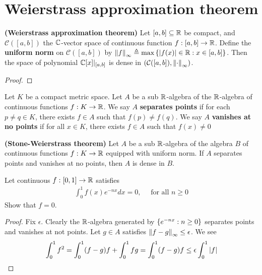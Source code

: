\documentclass{report}
\begin{document}
\section{Weierstrass approximation theorem} 

\begin{theorem}
\label{THWat}
\textbf{(Weierstrass approximation theorem)} Let $[a,b]\subseteq \mathbb{R}$ be compact, and $\mathcal{C}([a,b])$ the $\mathbb{C}$-vector space of continuous function $f:[a,b]\rightarrow \mathbb{R}$. Define the \textbf{uniform norm} on $\mathcal{C}([a,b])$ by $\left\| f \right\|_{\infty} \triangleq \max \left\{ \left|f(x)\right| \in\mathbb{R}: x \in [a,b] \right\}$. Then the space of polynomial $\mathbb{C}[x]|_{[a,b]}$ is dense in $\left(\mathcal{C}([a,b]), \left\| \cdot \right\|_{\infty} \right)$. 
\end{theorem}
\begin{proof}

\end{proof}


Let $K$ be a compact metric space. Let $A$ be a sub $\mathbb{R}$-algebra of the $\mathbb{R}$-algebra of continuous functions $f:K\rightarrow \mathbb{R}$. We say $A$  \textbf{separates points} if for each $p\neq  q \in K$, there exists $f\in A$ such that $f(p)\neq f(q)$. We say $A$  \textbf{vanishes at no points} if for all $x \in K$, there exists $f \in A$ such that $f(x)\neq 0$
\begin{theorem}
\textbf{(Stone-Weierstrass theorem)} Let $A$ be a sub $\mathbb{R}$-algebra of the algebra $B$ of continuous functions $f:K\rightarrow \mathbb{R}$ equipped with uniform norm. If $A$ separates points and vanishes at no points, then $A$ is dense in $B$. 
\end{theorem}
\begin{question}{}{}
Let continuous $f:[0,1]\rightarrow \mathbb{R}$  satisfies 
\begin{align*}
\int_0^1 f(x)e^{-nx}dx=0,\quad \text{ for all }n \geq 0
\end{align*}
Show that $f=0$. 
\end{question}
\begin{proof}
Fix $\epsilon $. Clearly the $\mathbb{R}$-algebra generated by  $\left\{ e^{-nx}:n\geq 0 \right\}$ separates points and vanishes at not points. Let $g \in A$ satisfies $\left\| f-g \right\|_{\infty}\leq \epsilon $. We see 
\begin{align*}
\int_0^1 f^2 = \int_0^1 (f-g)f + \int_0^1 fg = \int_0^1 (f-g)f \leq \epsilon \int_0^1 \left|f\right| 
\end{align*}
\end{proof}
\end{document}
